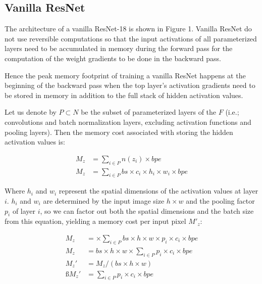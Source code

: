 \documentclass[twocolumn]{bmcart}
\begin{document}
\subsection{Vanilla ResNet}

The architecture of a vanilla ResNet-18 is shown in Figure 1.
Vanilla ResNet do not use reversible computations so that the input activations of all parameterized layers need to be accumulated in memory during the forward pass for the computation of the weight gradients to be done in the backward pass.

Hence the peak memory footprint of training a vanilla ResNet happens at the beginning of the backward pass when the top layer's activation gradients need to be stored in memory in addition to the full stack of hidden activation values.

Let us denote by $P \subset N$ be the subset of parameterized layers of the $F$ (i.e.; convolutions and batch normalization layers, excluding activation functions and pooling layers). Then the memory cost associated with storing the hidden activation values is: 

\begin{subequations}
\begin{align}
M_{z} &= \sum_{i \in P} n(z_i) \times bpe \\
M_{z} &= \sum_{i \in P} bs \times c_i \times h_i \times w_i \times bpe 
\end{align}
\end{subequations}

Where $h_i$ and $w_i$ represent the spatial dimensions of the activation values at layer $i$.
$h_i$ and $w_i$ are determined by the input image size $h \times w$ and the pooling factor $p_i$ of layer $i$, so we can factor out both the spatial dimensions and the batch size from this equation, yielding a memory cost per input pixel $M'_z$:

\begin{subequations}
\begin{align}
M_{z} &= \times \sum_{i \in P} bs \times h \times w \times p_i \times c_i \times bpe \\
M_{z} &= bs \times h \times w \times \sum_{i \in P} p_i \times c_i \times bpe \\
M_{z}' &= M_{z} / (bs \times h \times w)  \\ß
M_{z}' &= \sum_{i \in P} p_i \times c_i \times bpe 
\end{align}
\end{subequations}
\end{document}
